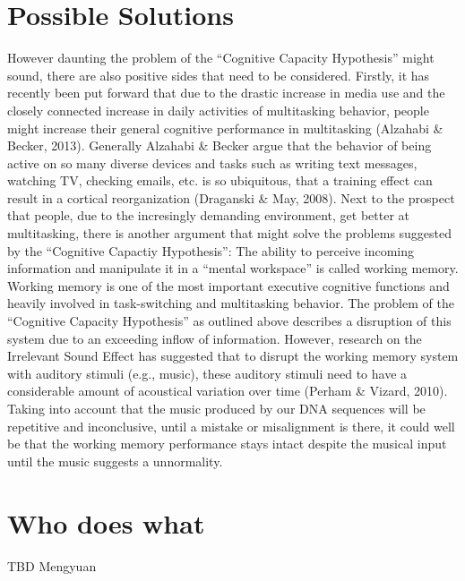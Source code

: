 \documentclass[12pt]{article}
\begin{document}
\section{Possible Solutions}
However daunting the problem of the “Cognitive Capacity Hypothesis” might sound, there are also positive sides that need to be considered. Firstly, it has recently been put forward that due to the drastic increase in media use and the closely connected increase in daily activities of multitasking behavior, people might increase their general cognitive performance in multitasking (Alzahabi \& Becker, 2013). Generally Alzahabi \& Becker argue that the behavior of being active on so many diverse devices and tasks such as writing text messages, watching TV, checking emails, etc. is so ubiquitous, that a training effect can result in a cortical reorganization (Draganski \& May, 2008). Next to the prospect that people, due to the incresingly demanding environment, get better at multitasking, there is another argument that might solve the problems suggested by the “Cognitive Capactiy Hypothesis”: The ability to perceive incoming information and manipulate it in a “mental workspace” is called working memory. Working memory is one of the most important executive cognitive functions and heavily involved in task-switching and multitasking behavior. The problem of the “Cognitive Capacity Hypothesis” as outlined above describes a disruption of this system due to an exceeding inflow of information. However, research on the Irrelevant Sound Effect has suggested that to disrupt the working memory system with auditory stimuli (e.g., music), these auditory stimuli need to have a considerable amount of acoustical variation over time (Perham \& Vizard, 2010). Taking into account that the music produced by our DNA sequences will be repetitive and inconclusive, until a mistake or misalignment is there, it could well be that the working memory performance stays intact despite the musical input until the music suggests a unnormality.

\section{Who does what}

TBD Mengyuan
\nocite{*}
\printbibliography
\end{document}
